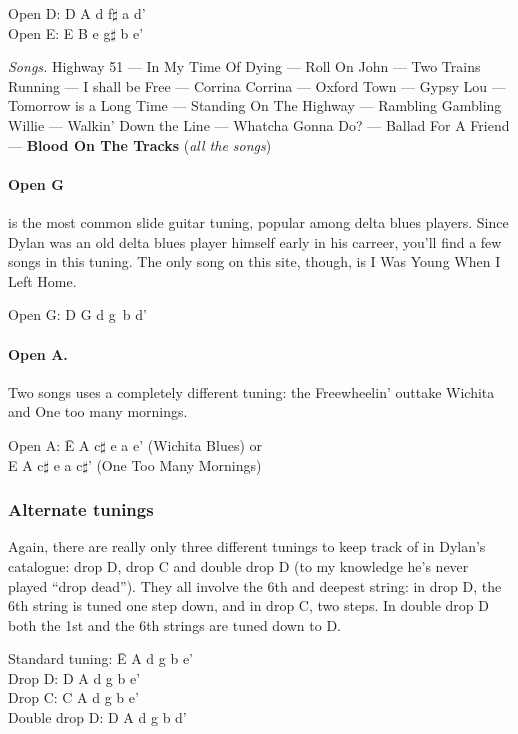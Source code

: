 \begin{articlelayout}
\noindent Open D: D A d f$\sharp$ a d'\\
Open E: E B e g$\sharp$ b e'

\emph{Songs.} Highway 51 --- In My Time Of Dying --- Roll On John ---
Two Trains Running --- I shall be Free --- Corrina
Corrina --- Oxford Town --- Gypsy Lou --- Tomorrow is a Long Time ---
Standing On The Highway --- Rambling Gambling Willie --- Walkin' Down the
Line --- Whatcha Gonna Do? --- Ballad For A Friend --- \textbf{Blood On The
Tracks} (\textit{all the songs})

\paragraph*{Open G} is the most common slide guitar tuning, popular among
delta blues players. Since Dylan was an old delta blues player himself
early in his carreer, you'll find a few songs in this tuning. The only
song on this site, though, is I Was Young When I Left Home.

\noindent Open G: D G d g~b d'

\paragraph*{Open A.} Two songs uses a completely different tuning: the
Freewheelin' outtake Wichita and One too many mornings.

\begin{tabbing}
Open A: \= E A c$\sharp$ e a e' (Wichita Blues) or\\
        \> E A c$\sharp$ e a c$\sharp$' (One Too Many Mornings)\\
\end{tabbing}

\subsubsection*{Alternate tunings}

Again, there are really only three different tunings to keep track of
in Dylan's catalogue: drop D, drop C and double drop D (to my
knowledge he's never played ``{}drop dead''{}). They all involve the
6th and deepest string: in drop D, the 6th string is tuned one step
down, and in drop C, two steps. In double drop D both the 1st and the
6th strings are tuned down to D.

\begin{tabbing}
Standard tuning: \= E A d g b e'\\
Drop D:          \> D A d g b e'\\
Drop C:          \> C A d g b e'\\
Double drop D:   \> D A d g b d'\\
\end{tabbing}


\end{articlelayout}

